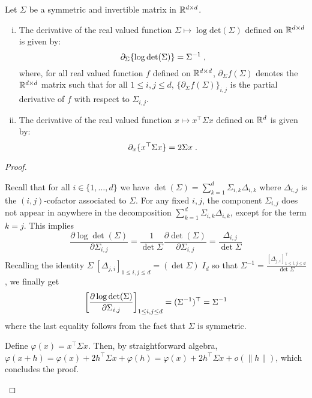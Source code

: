 \begin{lemma}
\label{lem:matrix:calculus}
Let $\Sigma$ be a symmetric and invertible  matrix in $\mathbb{R}^{d\times d}$.
\begin{enumerate}[(i)]
\item The derivative of the real valued function $\Sigma \mapsto \log\mathrm{det}(\Sigma)$ defined on $\mathbb{R}^{d\times d}$ is given by:
\[
\partial_{\Sigma}\{\log\mathrm{det}(\Sigma)\}= \Sigma^{-1}\;,
\]
where, for all real valued function $f$ defined on $\mathbb{R}^{d\times d}$, $\partial_{\Sigma}f(\Sigma)$ denotes the $\mathbb{R}^{d\times d}$ matrix such that for all $1\leqslant i,j\leqslant d$, $\{\partial_{\Sigma}f(\Sigma)\}_{i,j}$ is the partial derivative of $f$ with respect to $\Sigma_{i,j}$.
\item The derivative of the real valued  function  $x\mapsto x^\top\Sigma x$ defined on $\mathbb{R}^d$ is given by:
\[
\partial_{x}\{x^\top\Sigma x\} = 2 \Sigma x\;.
\]
\end{enumerate}
\end{lemma}
\begin{proof}
  \begin{enumerateList}
    \item Recall that for all $i \in \{1,\ldots,d\}$ we have
      $\det(\Sigma)=\sum_{k=1}^d \Sigma_{i,k} \Delta_{i,k}$ where
      $\Delta_{i,j}$ is the $(i,j)$-cofactor associated to
      $\Sigma$. For any fixed $i,j$, the component $\Sigma_{i,j}$ does not appear in anywhere in
      the decomposition $\sum_{k=1}^d \Sigma_{i,k} \Delta_{i,k}$,
      except for the term $k=j$. This implies
      $$
      \frac{\partial \log \det(\Sigma)}{\partial \Sigma_{i,j}}=
      \frac{1}{\det \Sigma}\frac{\partial  \det(\Sigma)}{\partial
        \Sigma_{i,j}}=\frac{\Delta_{i,j}}{\det  \Sigma}
      $$
      Recalling the identity $\Sigma\; [\Delta_{j,i}]_{1\leq i,j \leq d}=(\det
      \Sigma)\; I_d$ so that $\Sigma^{-1}=\frac{[\Delta_{j,i}]_{1\leq i,j \leq d}^\top}{\det
      \Sigma}$, we finally get
      $$
\left[ \frac{\partial \log \mathrm{det}(\Sigma)}{\partial \Sigma_{i,j}} \right]_{1\leq
  i,j  \leq d}=(\Sigma^{-1})^\top=\Sigma^{-1}
$$
where the last equality follows from the fact that $\Sigma$ is
symmetric.
\item Define $\varphi(x)=x^\top\Sigma x$. Then, by straightforward
  algebra, $\varphi(x+h)=\varphi(x)+2h^\top\Sigma
  x+\varphi(h)=\varphi(x)+2h^\top\Sigma x+o(\|h\|)$, which concludes the
  proof.
  \end{enumerateList}
\end{proof}
